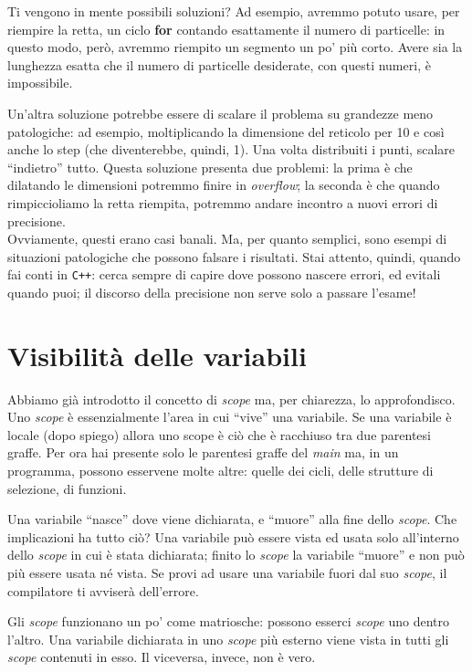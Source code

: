 	Ti vengono in mente possibili soluzioni? Ad esempio, avremmo potuto usare, per riempire la retta, un ciclo \textbf{for} contando esattamente il numero di particelle: in questo modo, però, avremmo riempito un segmento un po' più corto. Avere sia la lunghezza esatta che il numero di particelle desiderate, con questi numeri, è impossibile.
	
	Un'altra soluzione potrebbe essere di scalare il problema su grandezze meno patologiche: ad esempio, moltiplicando la dimensione del reticolo per 10 e così anche lo step (che diventerebbe, quindi, 1). Una volta distribuiti i punti, scalare ``indietro'' tutto. Questa soluzione presenta due problemi: la prima è che dilatando le dimensioni potremmo finire in \emph{overflow}; la seconda è che quando rimpiccioliamo la retta riempita, potremmo andare incontro a nuovi errori di precisione.\\
	
	
	Ovviamente, questi erano casi banali. Ma, per quanto semplici, sono esempi di situazioni patologiche che possono falsare i risultati.  Stai attento, quindi, quando fai conti in \verb|C++|: cerca sempre di capire  dove possono nascere errori, ed evitali quando puoi; il discorso della precisione non serve solo a passare l'esame! 
	\section{Visibilità delle variabili}
	Abbiamo già introdotto il concetto di \emph{scope} ma, per chiarezza, lo approfondisco. Uno \emph{scope} è essenzialmente l'area in cui ``vive'' una variabile. Se una variabile è locale (dopo spiego) allora uno scope è ciò che è racchiuso tra due parentesi graffe. Per ora hai presente solo le parentesi graffe del \emph{main} ma, in un programma, possono esservene molte altre: quelle dei cicli, delle strutture di selezione, di funzioni. 
	
	Una variabile ``nasce'' dove viene dichiarata, e ``muore'' alla fine dello \emph{scope}. Che implicazioni ha tutto ciò? Una variabile può essere vista ed usata solo all'interno dello \emph{scope} in cui è stata dichiarata; finito lo \emph{scope} la variabile ``muore'' e non può più essere usata né  vista. Se provi ad usare una variabile fuori dal suo \emph{scope}, il compilatore ti avviserà dell'errore. 
	
	Gli \emph{scope} funzionano un po' come matriosche: possono esserci \emph{scope} uno dentro l'altro. Una variabile dichiarata in uno \emph{scope} più esterno viene vista in tutti gli \emph{scope} contenuti in esso. Il viceversa, invece, non è vero. 
	
